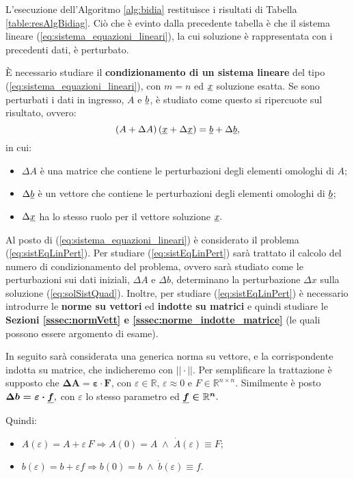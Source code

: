 L'esecuzione dell'Algoritmo \ref{alg:bidia} restituisce i risultati di Tabella \ref{table:resAlgBidiag}. Ciò che è evinto dalla precedente tabella è che il sistema lineare (\ref{eq:sistema_equazioni_lineari}), la cui soluzione è rappresentata con i precedenti dati, è perturbato.

È necessario studiare il \textbf{condizionamento di un sistema lineare} del tipo (\ref{eq:sistema_equazioni_lineari}), con $m=n$ ed $\uline x$ soluzione esatta. Se sono perturbati i dati in ingresso, $A$ e $\uline b$, è studiato come questo si ripercuote sul risultato, ovvero:
\begin{equation}\label{eq:sistEqLinPert}
    \left(A+\Delta A\right)\left(\uline x + \Delta\uline x\right) = \uline b +\Delta\uline b,
\end{equation}
in cui:
\begin{itemize}
    \item $\Delta A$ è una matrice che contiene le perturbazioni degli elementi omologhi di $A$;
    \item $\Delta\uline b$ è un vettore che contiene le perturbazioni degli elementi omologhi di $\uline b$;
    \item $\Delta\uline x$ ha lo stesso ruolo per il vettore soluzione $\uline x.$
\end{itemize}

Al posto di (\ref{eq:sistema_equazioni_lineari}) è considerato il problema (\ref{eq:sistEqLinPert}). Per studiare (\ref{eq:sistEqLinPert}) sarà trattato il calcolo del numero di condizionamento del problema, ovvero sarà studiato come le perturbazioni sui dati iniziali, $\Delta A$ e $\Delta b$, determinano la perturbazione $\Delta x$ sulla soluzione (\ref{eq:solSistQuad}). Inoltre, per studiare (\ref{eq:sistEqLinPert}) è necessario introdurre le \textbf{norme su vettori} ed \textbf{indotte su matrici} e quindi studiare le \textbf{Sezioni \ref{sssec:normVett} e \ref{sssec:norme_indotte_matrice}} (le quali possono essere argomento di esame).

In seguito sarà considerata una generica norma su vettore, e la corrispondente indotta su matrice, che indicheremo con $||\cdot||.$ Per semplificare la trattazione è supposto che $\boldsymbol{\Delta A=\varepsilon\cdot F}$, con $\varepsilon\in\mathbb R,\,\varepsilon\approx 0$ e $F\in\mathbb R^{n\times n}.$ Similmente è posto $\boldsymbol{\Delta b = \varepsilon\cdot\uline f},$ con $\varepsilon$ lo stesso parametro ed $\boldsymbol{\uline f\in\mathbb R^n}.$

Quindi:
\begin{itemize}
    \item $A(\varepsilon)=A+\varepsilon\, F \Rightarrow A(0)=A\;\wedge\; \dot A(\varepsilon)\equiv F;$
    \item  $b(\varepsilon)=b+\varepsilon f\Rightarrow b(0)=b\; \wedge\; \dot{b}(\varepsilon)\equiv f.$
\end{itemize}

